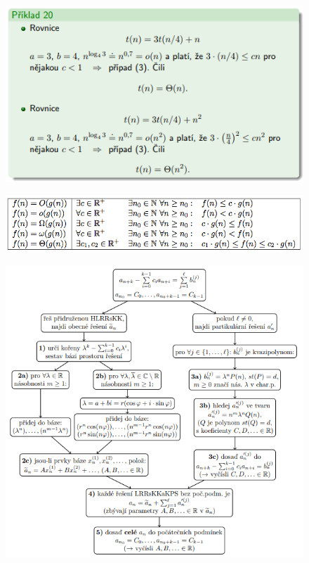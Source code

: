 \documentclass{szzclass}
\begin{document}
\begin{figure}
    \includegraphics[width=.8\textwidth, center]{topics/bi-spol-32/images/mt2.PNG}
\end{figure}

\begin{figure}
    \includegraphics[width=\textwidth, center]{topics/bi-spol-32/images/slozitost.png}
\end{figure}


\begin{figure}
    \includegraphics[width=1\textwidth, center]{topics/bi-spol-32/images/kuchar.PNG}
\end{figure}
    
\end{document}
